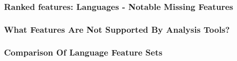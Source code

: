 \begin{frame}[fragile]
\frametitle{Ranked features: Languages - Notable Missing Features}

\end{frame}



\begin{frame}
\frametitle{What Features Are Not Supported By Analysis Tools?}

\end{frame}



\begin{frame}[fragile]
\frametitle{Comparison Of Language Feature Sets}
\begin{columns}[t] %


\end{columns}


\end{frame}







